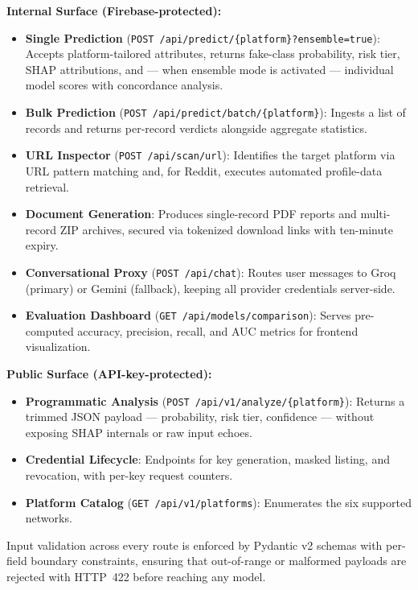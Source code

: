 \documentclass[conference]{IEEEtran}
\begin{document}
\textbf{Internal Surface (Firebase-protected):}
\begin{itemize}
    \item \textbf{Single Prediction} (\texttt{POST /api/predict/\{platform\}?ensemble=true}): Accepts platform-tailored attributes, returns fake-class probability, risk tier, SHAP attributions, and --- when ensemble mode is activated --- individual model scores with concordance analysis.
    \item \textbf{Bulk Prediction} (\texttt{POST /api/predict/batch/\{platform\}}): Ingests a list of records and returns per-record verdicts alongside aggregate statistics.
    \item \textbf{URL Inspector} (\texttt{POST /api/scan/url}): Identifies the target platform via URL pattern matching and, for Reddit, executes automated profile-data retrieval.
    \item \textbf{Document Generation}: Produces single-record PDF reports and multi-record ZIP archives, secured via tokenized download links with ten-minute expiry.
    \item \textbf{Conversational Proxy} (\texttt{POST /api/chat}): Routes user messages to Groq (primary) or Gemini (fallback), keeping all provider credentials server-side.
    \item \textbf{Evaluation Dashboard} (\texttt{GET /api/models/comparison}): Serves pre-computed accuracy, precision, recall, and AUC metrics for frontend visualization.
\end{itemize}

\textbf{Public Surface (API-key-protected):}
\begin{itemize}
    \item \textbf{Programmatic Analysis} (\texttt{POST /api/v1/analyze/\{platform\}}): Returns a trimmed JSON payload --- probability, risk tier, confidence --- without exposing SHAP internals or raw input echoes.
    \item \textbf{Credential Lifecycle}: Endpoints for key generation, masked listing, and revocation, with per-key request counters.
    \item \textbf{Platform Catalog} (\texttt{GET /api/v1/platforms}): Enumerates the six supported networks.
\end{itemize}

Input validation across every route is enforced by Pydantic v2 schemas with per-field boundary constraints, ensuring that out-of-range or malformed payloads are rejected with HTTP~422 before reaching any model.
\end{document}
